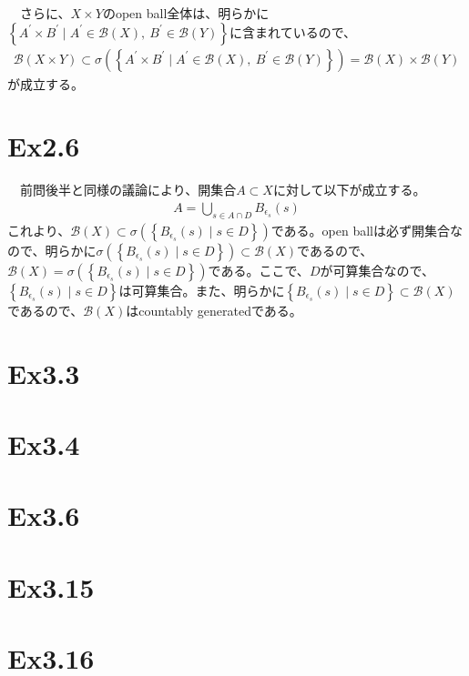 \documentclass{article}
\begin{document}
　さらに、$X\times Y$のopen ball全体は、明らかに$\left\{ A^{'} \times B^{'} \mid A^{'} \in \mathcal{B}(X),\ B^{'} \in \mathcal{B}(Y) \right\}$に含まれているので、
\begin{align*}
	\mathcal{B}(X\times Y) \subset \sigma\left( \left\{ A^{'} \times B^{'} \mid A^{'} \in \mathcal{B}(X),\ B^{'} \in \mathcal{B}(Y) \right\} \right) = \mathcal{B}(X)\times\mathcal{B}(Y)
\end{align*}
が成立する。

\section{Ex2.6}
　前問後半と同様の議論により、開集合$A\subset X$に対して以下が成立する。
\begin{align*}
	A = \bigcup_{s\in A\cap D} B_{\epsilon_s}(s)
\end{align*}
これより、$\mathcal{B}(X)\subset \sigma\left( \left\{ B_{\epsilon_s}(s)\mid s\in D \right\} \right)$である。open ballは必ず開集合なので、明らかに$\sigma\left( \left\{ B_{\epsilon_s}(s)\mid s\in D \right\} \right) \subset \mathcal{B}(X)$であるので、$\mathcal{B}(X) = \sigma\left( \left\{ B_{\epsilon_s}(s)\mid s\in D \right\} \right)$である。ここで、$D$が可算集合なので、$\left\{ B_{\epsilon_s}(s)\mid s\in D \right\}$は可算集合。また、明らかに$\left\{ B_{\epsilon_s}(s)\mid s\in D \right\} \subset \mathcal{B}(X)$であるので、$\mathcal{B}(X)$はcountably generatedである。


\section{Ex3.3}

\section{Ex3.4}

\section{Ex3.6}

\section{Ex3.15}

\section{Ex3.16}
\end{document}
